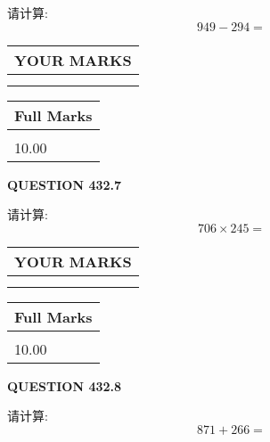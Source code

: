 \documentclass{ctexart}
\begin{document}
  
 
请计算:
\begin{equation}
949 -   %
294 = \nonumber
\end{equation}
 

 

 
  
\vspace{0.2in}
  
\noindent\begin{tabular}{|l|}
\hline
 YOUR MARKS  \\
\hline
 \\ 
 \\ 
\hline
\end{tabular}
\hspace{0.05in} \begin{tabular}{|l|}
\hline
 Full Marks  \\
\hline
 \\ 
10.00 \\
\hline
\end{tabular}
{\textbf{\Large{QUESTION
432.7 
}}}
  
  
 
请计算:
\begin{equation}
706  \times    %
245 = \nonumber
\end{equation}
 

 

 
  
\vspace{0.2in}
  
\noindent\begin{tabular}{|l|}
\hline
 YOUR MARKS  \\
\hline
 \\ 
 \\ 
\hline
\end{tabular}
\hspace{0.05in} \begin{tabular}{|l|}
\hline
 Full Marks  \\
\hline
 \\ 
10.00 \\
\hline
\end{tabular}
{\textbf{\Large{QUESTION
432.8 
}}}
  
  
 
请计算:
\begin{equation}
871 +  %
266 = \nonumber
\end{equation}
 

 

 
  
\vspace{0.2in}
  
\end{document}
